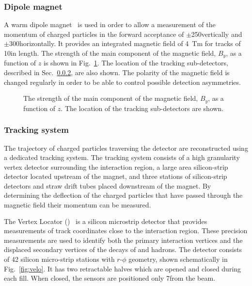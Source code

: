 \subsubsection{Dipole magnet}

A warm dipole magnet~\cite{magnet-tdr} is used in order to allow a measurement of the momentum of charged particles in the forward acceptance of $\pm$250\mrad vertically and $\pm$300\mrad horizontally. It provides an integrated magnetic field of 4~Tm for tracks of 10\m in length. The strength of the main component of the magnetic field, $B_{y}$, as a function of $z$ is shown in Fig.~\ref{fig:magnet}. The location of the tracking sub-detectors, described in Sec.~\ref{sec:lhcb:tracking}, are also shown. The polarity of the magnetic field is changed regularly in order to be able to control possible detection asymmetries.

\begin{figure}[!tb]
\centering
{}
\caption{The strength of the main component of the magnetic field, $B_{y}$, as a function of $z$. The location of the tracking sub-detectors are shown.}
\label{fig:magnet}
\end{figure}

\subsubsection{Tracking system}
\label{sec:lhcb:tracking}

The trajectory of charged particles traversing the \lhcb detector are reconstructed using a dedicated tracking system. The tracking system consists of a high granularity vertex detector surrounding the \proton\proton interaction region, a large area silicon-strip detector located upstream of the magnet, and three stations of silicon-strip detectors and straw drift tubes placed downstream of the magnet. By determining the deflection of the charged particles that have passed through the magnetic field their momentum can be measured.

The Vertex Locator (\velo)~\cite{velo-tdr,velo-perf} is a silicon microstrip detector that provides measurements of track coordinates close to the \proton\proton interaction region. These precision measurements are used to identify both the primary interaction vertices and the displaced secondary vertices of the decays of \bquark and \cquark hadrons. The detector consists of 42 silicon micro-strip stations with $r$-$\phi$ geometry, shown schematically in Fig.~\ref{fig:velo}. It has two retractable halves which are opened and closed during each \lhc fill. When closed, the sensors are positioned only 7\mm from the \lhc beam. 

